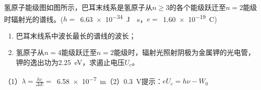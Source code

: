 氢原子能级图如图所示，巴耳末线系是氢原子从\(n \ge 3\)的各个能级跃迁至\(n = 2\)能级时辐射光的谱线。(\(h =\) \,\qty{6.63e-34}{J\cdot s}，\(e =\) \,\qty{1.60e-19}{C})
\begin{enumerate}
    \item 巴耳末线系中波长最长的谱线的波长；
    \item 氢原子从\(n = 4\)能级跃迁至\(n = 2\)能级时，辐射光照射阴极为金属钾的光电管，钾的逸出功为\qty{2.25}{eV}，求遏止电压\(U_c\)。
\end{enumerate} 

\begin{answer}
    （1）\(\lambda = \frac{hc}{\Delta E} =\) \,\qty{6.58e-7}{m}（2）\qty{0.3}{V}\qquad 提示：\(eU_c = h\nu - W_0\)
\end{answer}